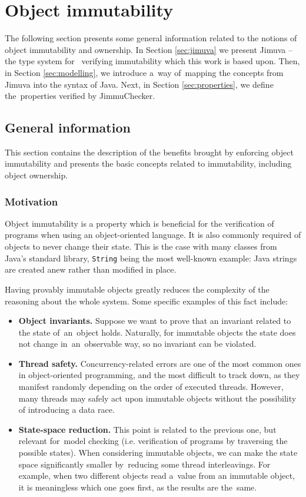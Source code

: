 \documentclass{pracamgr}
\theoremstyle{break}
\theoremstyle{break}
\theoremstyle{break}
\begin{document}
\chapter{Object immutability}
\label{chap:imm}

The following section presents some general information related to the
notions of object immutability and ownership. In Section
\ref{sec:jimuva} we present Jimuva -- the type system for~
ve\-ri\-fy\-ing immutability which this work is based upon. Then, in
Section \ref{sec:modelling}, we introduce a~way of~mapping the
concepts from Jimuva into the syntax of Java. Next, in Section
\ref{sec:properties}, we define the~properties verified by
JimmuChecker.

\section{General information}
\label{sec:imm-general}

This section contains the description of the benefits brought by
enforcing object immutability and presents the basic concepts related
to immutability, including object ownership.

\subsection{Motivation}

Object immutability is a property which is beneficial for the
verification of programs when using an object-oriented language. It is
also commonly required of objects to never change their state. This is
the case with many classes from Java's standard library,
\texttt{String} being the most well-known example: Java strings are
created anew rather than modified in place.

Having provably immutable objects greatly reduces the complexity of
the reasoning about the whole system. Some specific examples of this
fact include: 
\begin{itemize}
\item \textbf{Object invariants.} Suppose we want to prove that an
  invariant related to the state of~an~object holds. Naturally, for
  immutable objects the state does not change in~an~observable way,
  so no invariant can be violated.
\item \textbf{Thread safety.} Concurrency-related errors are one of
  the most common ones in object-oriented programming, and the most
  difficult to track down, as they manifest randomly depending on the
  order of executed threads. However, many threads may safely act upon
  immutable objects without the possibility of introducing a data race.
\item \textbf{State-space reduction.} This point is related to the
  previous one, but relevant for~mo\-del checking (i.e. verification
  of programs by traversing the possible states). When considering
  immutable objects, we can make the state space significantly smaller
  by~reducing some thread interleavings. For example, when two
  different objects read a~value from an immutable object, it is
  meaningless which one goes first, as the results are the~same.
\end{itemize}
\end{document}
